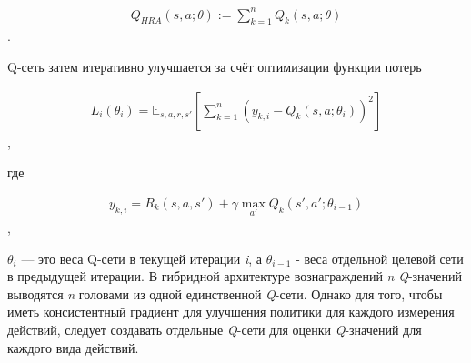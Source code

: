 \begin{equation}
    \begin{multlined}
        Q_{H R A}(s, a; \theta) := \sum^n_{k=1} Q_k(s, a;\theta)
    \end{multlined}
\end{equation}.

Q-сеть затем итеративно улучшается за счёт оптимизации функции потерь

\begin{equation}
    \begin{multlined}
        L_i(\theta_i) = \mathbb{E}_{s, a, r, s'}[\sum^n_{k=1}(y_{k, i}-Q_k(s, a;\theta_i))^2]
    \end{multlined}
\end{equation}, 

где

\begin{equation}
    \begin{multlined}
        y_{k, i} = R_k(s, a, s') + \gamma \max_{a'} Q_k(s', a';\theta_{i-1})
    \end{multlined}
\end{equation},

$\theta_i$ — это веса Q-сети в текущей итерации \textit{i}, а $\theta_{i-1}$ - веса отдельной целевой сети в предыдущей итерации.
В гибридной архитектуре вознаграждений \textit{n} \textit{Q}-значений выводятся \textit{n} головами из одной единственной \textit{Q}-сети. Однако для того, чтобы иметь консистентный градиент для улучшения политики для каждого измерения действий, следует создавать отдельные \textit{Q}-сети для оценки \textit{Q}-значений для каждого вида действий.

